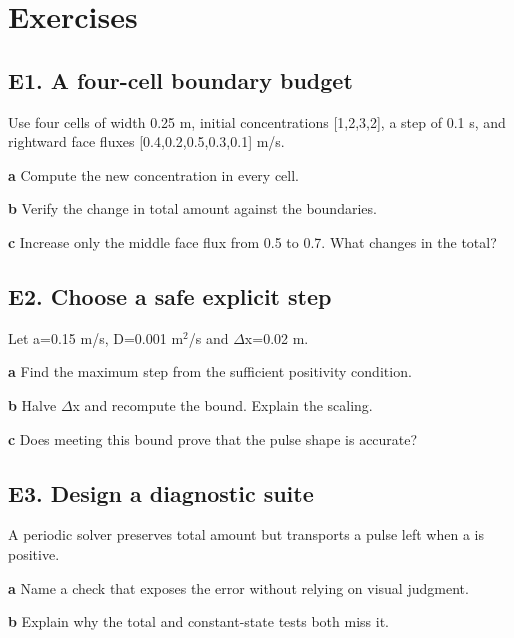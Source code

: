 \documentclass[11pt,letterpaper]{article}
\theoremstyle{definition}\newtheorem{definition}{Definition}\newtheorem{example}{Example}
\numberwithin{equation}{section}
\begin{document}
\section*{Exercises}
\par\noindent\begin{minipage}{\linewidth}
\subsection*{E1. A four-cell boundary budget}
Use four cells of width 0.25 m, initial concentrations [1,2,3,2], a step of 0.1 s, and rightward face fluxes [0.4,0.2,0.5,0.3,0.1] m/s.

\textbf{a} Compute the new concentration in every cell.

\end{minipage}\par\medskip
\textbf{b} Verify the change in total amount against the boundaries.

\textbf{c} Increase only the middle face flux from 0.5 to 0.7. What changes in the total?

\par\noindent\begin{minipage}{\linewidth}
\subsection*{E2. Choose a safe explicit step}
Let a=\allowbreak{}0.15 m/s, D=\allowbreak{}0.001 m$^2$/s and $\Delta$x=\allowbreak{}0.02 m.

\textbf{a} Find the maximum step from the sufficient positivity condition.

\end{minipage}\par\medskip
\textbf{b} Halve $\Delta$x and recompute the bound. Explain the scaling.

\textbf{c} Does meeting this bound prove that the pulse shape is accurate?

\par\noindent\begin{minipage}{\linewidth}
\subsection*{E3. Design a diagnostic suite}
A periodic solver preserves total amount but transports a pulse left when a is positive.

\textbf{a} Name a check that exposes the error without relying on visual judgment.

\end{minipage}\par\medskip
\textbf{b} Explain why the total and constant-state tests both miss it.
\end{document}
